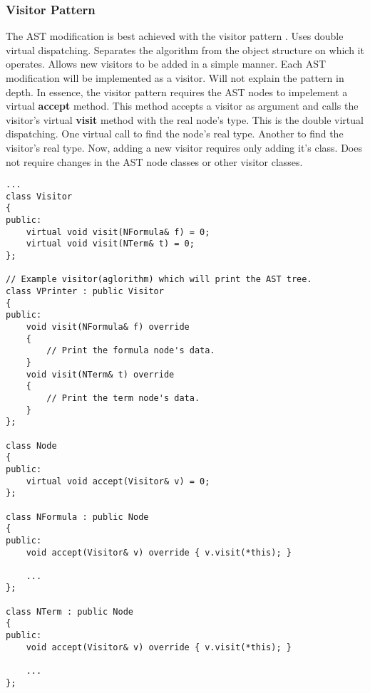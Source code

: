 \documentclass{article}
\begin{document}

	\subsubsection{Visitor Pattern} The AST modification is best achieved with the visitor pattern \cite{visitor-pattern}. Uses double virtual dispatching. Separates the algorithm from the object structure on which it operates. Allows new visitors to be added in a simple manner. Each AST modification will be implemented as a visitor. Will not explain the pattern in depth. In essence, the visitor pattern requires the AST nodes to impelement a virtual \textbf{accept} method. This method accepts a visitor as argument and calls the visitor's virtual \textbf{visit} method with the real node's type. This is the double virtual dispatching. One virtual call to find the node's real type. Another to find the visitor's real type. Now, adding a new visitor requires only adding it's class. Does not require changes in the AST node classes or other visitor classes.

\newpage
\begin{lstlisting}
...
class Visitor
{
public:
    virtual void visit(NFormula& f) = 0;
    virtual void visit(NTerm& t) = 0;
};

// Example visitor(aglorithm) which will print the AST tree.
class VPrinter : public Visitor
{
public:
    void visit(NFormula& f) override
    {
        // Print the formula node's data.
    }
    void visit(NTerm& t) override
    {
        // Print the term node's data.
    }
};

class Node
{
public:
    virtual void accept(Visitor& v) = 0;
};

class NFormula : public Node
{
public:
    void accept(Visitor& v) override { v.visit(*this); }

    ...
};

class NTerm : public Node
{
public:
    void accept(Visitor& v) override { v.visit(*this); }

    ...
};
\end{lstlisting}
\end{document}

